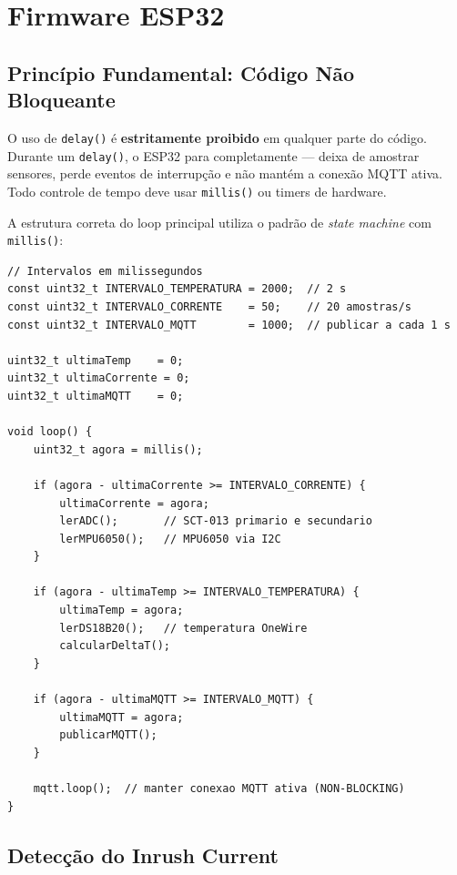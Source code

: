 \documentclass[12pt, a4paper]{article}
\begin{document}
\section{Firmware ESP32}

\subsection{Princípio Fundamental: Código Não Bloqueante}

\begin{tcolorbox}[caixaAlerta, title={Regra Absoluta do Firmware}]
O uso de \texttt{delay()} é \textbf{estritamente proibido} em qualquer parte do código. Durante um \texttt{delay()}, o ESP32 para completamente --- deixa de amostrar sensores, perde eventos de interrupção e não mantém a conexão MQTT ativa. Todo controle de tempo deve usar \texttt{millis()} ou timers de hardware.
\end{tcolorbox}

A estrutura correta do loop principal utiliza o padrão de \textit{state machine} com \texttt{millis()}:

\begin{lstlisting}[style=cpp, caption={Estrutura não bloqueante com millis()}]
// Intervalos em milissegundos
const uint32_t INTERVALO_TEMPERATURA = 2000;  // 2 s
const uint32_t INTERVALO_CORRENTE    = 50;    // 20 amostras/s
const uint32_t INTERVALO_MQTT        = 1000;  // publicar a cada 1 s

uint32_t ultimaTemp    = 0;
uint32_t ultimaCorrente = 0;
uint32_t ultimaMQTT    = 0;

void loop() {
    uint32_t agora = millis();

    if (agora - ultimaCorrente >= INTERVALO_CORRENTE) {
        ultimaCorrente = agora;
        lerADC();       // SCT-013 primario e secundario
        lerMPU6050();   // MPU6050 via I2C
    }

    if (agora - ultimaTemp >= INTERVALO_TEMPERATURA) {
        ultimaTemp = agora;
        lerDS18B20();   // temperatura OneWire
        calcularDeltaT();
    }

    if (agora - ultimaMQTT >= INTERVALO_MQTT) {
        ultimaMQTT = agora;
        publicarMQTT();
    }

    mqtt.loop();  // manter conexao MQTT ativa (NON-BLOCKING)
}
\end{lstlisting}

\subsection{Detecção do Inrush Current}
\end{document}
